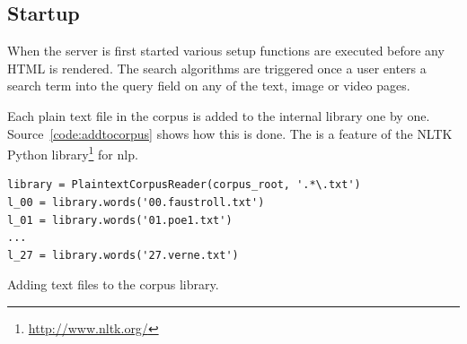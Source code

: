 

\subsection{Startup}
\label{s:index}

When the server is first started various setup functions are executed before any HTML is rendered. The search algorithms are triggered once a user enters a search term into the query field on any of the text, image or video pages.

Each plain text file in the corpus is added to the internal library one by one. Source~\ref{code:addtocorpus} shows how this is done. The  is a feature of the \ac{NLTK} Python library\footnote{\url{http://www.nltk.org/}} for \acrlong{nlp}.

\begin{listing}
  \begin{verbatim}
library = PlaintextCorpusReader(corpus_root, '.*\.txt')
l_00 = library.words('00.faustroll.txt')
l_01 = library.words('01.poe1.txt')
...
l_27 = library.words('27.verne.txt')
  \end{verbatim}
\caption{Adding text files to the corpus library.}
\label{code:addtocorpus}
\end{listing}

